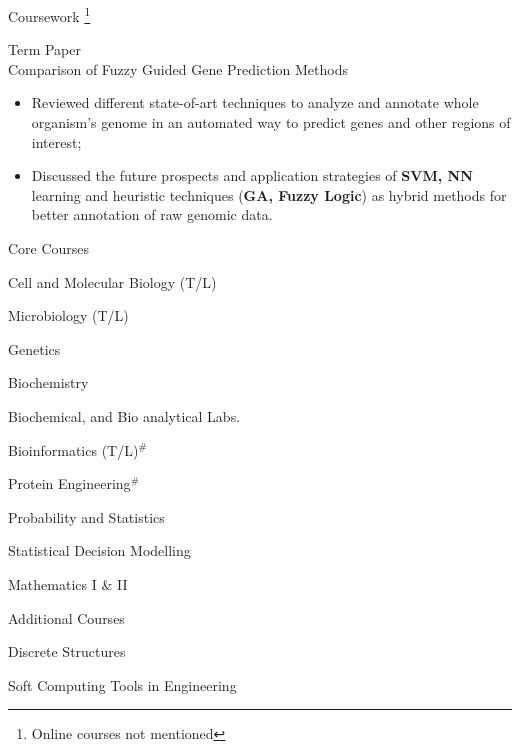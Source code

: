 \documentclass{article}
\newlength{\tabin}
\newlength{\secsep}
\newcommand{\lineunder}{\vspace*{-8pt} \\ \hspace*{-6pt} \hrulefill \\ \vspace*{-15pt}}
\newenvironment{tabbedsection}[1]{
  \begin{list}{}{
      \setlength{\itemsep}{0pt}
      \setlength{\labelsep}{0pt}
      \setlength{\labelwidth}{0pt}
      \setlength{\leftmargin}{\tabin}
      \setlength{\rightmargin}{\tabin}
      \setlength{\listparindent}{0pt}
      \setlength{\parsep}{0pt}
      \setlength{\parskip}{0pt}
      \setlength{\partopsep}{0pt}
      \setlength{\topsep}{#1}
    }
  \item[]
}{\end{list}}
\newenvironment{resume_section}[1]{
  \filbreak
  \vspace{2\secsep}
  \textsc{\large#1}
  \lineunder
  \begin{tabbedsection}{\secsep}
}{\end{tabbedsection}}
\newenvironment{resume_subsection}[2][]{
  \textbf{#2} \hfill {\footnotesize #1} \hspace*{-3.5em}
  \begin{tabbedsection}{0.5\secsep}
}{\end{tabbedsection}}
\newenvironment{subitems}{
  \renewcommand{\labelitemi}{$\cdot$}
  \begin{itemize}
      \setlength{\labelsep}{1em}
}{\end{itemize}}
\begin{document}
\begin{resume_section}{Coursework \footnote{Online courses not mentioned}}
    \begin{resume_subsection}{Term Paper \\ Comparison of Fuzzy Guided Gene Prediction Methods}
        \begin{subitems}
          \item Reviewed different state-of-art techniques to analyze and annotate whole organism's genome in an automated way to predict genes and other regions of interest;
          \item Discussed the future prospects and application strategies of \textbf{SVM, NN} learning and heuristic techniques (\textbf{GA, Fuzzy Logic}) as hybrid methods for better annotation of raw genomic data.\newpage
        \end{subitems}
    \end{resume_subsection}

    \begin{resume_subsection}{Core Courses}
    \vspace*{-8pt}
    \begin{subitems}
        \begin{multicols}{2}
        \item Cell and Molecular Biology (T/L)
        \item Microbiology (T/L)
        \item Genetics
        \item Biochemistry
        \item Biochemical, and Bio analytical Labs.
        \item Bioinformatics (T/L)$^{\#}$
        \item Protein Engineering$^{\#}$
        \item Probability and Statistics
        \item Statistical Decision Modelling
        \item Mathematics I \& II
        \end{multicols}
    \end{subitems}
\end{resume_subsection}

    \begin{resume_subsection}{Additional Courses}
    \vspace*{-8pt}
        \begin{subitems}
            \begin{multicols}{2}
            \item Discrete Structures
            \item Soft Computing Tools in Engineering
            \end{multicols}
        \end{subitems}
    \end{resume_subsection}
\end{resume_section}
\end{document}
